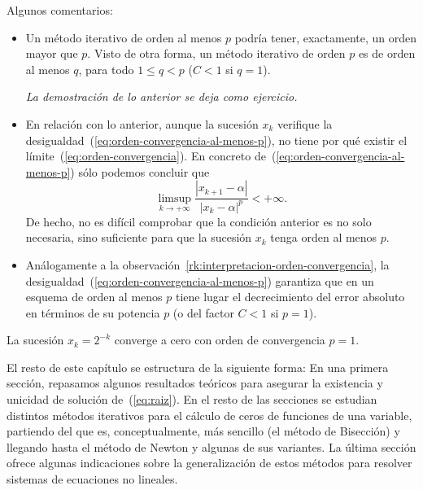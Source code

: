 Algunos comentarios:
\begin{itemize}
\item Un método iterativo de orden al menos $p$ podría tener,
  exactamente, un orden mayor que $p$. Visto de otra forma, un método
  iterativo de orden $p$ es de orden al menos $q$, para todo $1\le q <
  p$ ($C<1$ si $q=1$).
  \begin{flushright}
    \vspace{-0.75em}
    \scriptsize \em La demostración de lo anterior se deja como ejercicio.
    \vspace{-0.75em}
  \end{flushright}
\item En relación con lo anterior, aunque la sucesión $x_k$
  verifique la desigualdad~(\ref{eq:orden-convergencia-al-menos-p}),
  no tiene por qué existir el límite~(\ref{eq:orden-convergencia}). En
  concreto de~(\ref{eq:orden-convergencia-al-menos-p}) sólo podemos
  concluir que
  \begin{equation*}
    \limsup_{k\to+\infty} \frac{|x_{k+1}-\alpha|}{|x_k-\alpha|^p} < +\infty.
  \end{equation*}
  De hecho, no es difícil comprobar que la condición anterior es no
  solo necesaria, sino suficiente para que la sucesión $x_{k}$ tenga
  orden al menos $p$.
\item Análogamente a la
  observación~\ref{rk:interpretacion-orden-convergencia}, la
  desigualdad~(\ref{eq:orden-convergencia-al-menos-p}) garantiza que
  en un esquema de orden al menos $p$ tiene lugar el decrecimiento del
  error absoluto en términos de su potencia $p$ (o del factor
  $C<1$ si $p=1$).
\end{itemize}

\begin{example}
  \label{rk:2}
  La sucesión $x_k=2^{-k}$ converge a cero con orden de convergencia $p=1$.
\end{example}

El resto de este capítulo se estructura de la siguiente forma: En una
primera sección, repasamos algunos resultados teóricos para asegurar
la existencia y unicidad de solución de~(\ref{eq:raiz}). En el resto
de las secciones se estudian distintos métodos iterativos para el
cálculo de ceros de funciones de una variable, partiendo del que es,
conceptualmente, más sencillo (el método de Bisección) y llegando
hasta el método de Newton y algunas de sus variantes.  La última
sección ofrece algunas indicaciones sobre la generalización de estos
métodos para resolver sistemas de ecuaciones no lineales.


